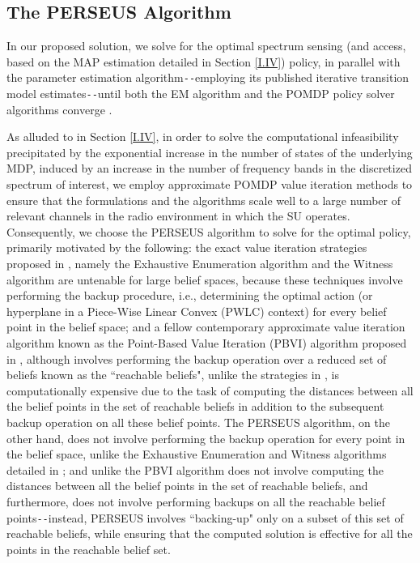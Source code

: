 \documentclass[12pt, draftcls, onecolumn]{IEEEtran}
\begin{document}
\subsection{The PERSEUS Algorithm}\label{II.II}
In our proposed solution, we solve for the optimal spectrum sensing (and access, based on the MAP estimation detailed in Section \ref{I.IV}) policy, in parallel with the parameter estimation algorithm\texttt{-{}-}employing its published iterative transition model estimates\texttt{-{}-}until both the EM algorithm and the POMDP policy solver algorithms converge \cite{WCL:paper}.

As alluded to in Section \ref{I.IV}, in order to solve the computational infeasibility precipitated by the exponential increase in the number of states of the underlying MDP, induced by an increase in the number of frequency bands in the discretized spectrum of interest, we employ approximate POMDP value iteration methods to ensure that the formulations and the algorithms scale well to a large number of relevant channels in the radio environment in which the SU operates. Consequently, we choose the PERSEUS algorithm \cite{WCL:13} to solve for the optimal policy, primarily motivated by the following: the exact value iteration strategies proposed in \cite{PUOccupancy:18}, namely the Exhaustive Enumeration algorithm and the Witness algorithm are untenable for large belief spaces, because these techniques involve performing the backup procedure, i.e., determining the optimal action (or hyperplane in a Piece-Wise Linear Convex (PWLC) context) for every belief point in the belief space; and a fellow contemporary approximate value iteration algorithm known as the Point-Based Value Iteration (PBVI) algorithm proposed in \cite{PUOccupancy:17}, although involves performing the backup operation over a reduced set of beliefs known as the ``reachable beliefs", unlike the strategies in \cite{PUOccupancy:17}, is computationally expensive due to the task of computing the distances between all the belief points in the set of reachable beliefs in addition to the subsequent backup operation on all these belief points. The PERSEUS algorithm, on the other hand, does not involve performing the backup operation for every point in the belief space, unlike the Exhaustive Enumeration and Witness algorithms detailed in \cite{PUOccupancy:18}; and unlike the PBVI algorithm \cite{PUOccupancy:17} does not involve computing the distances between all the belief points in the set of reachable beliefs, and furthermore, does not involve performing backups on all the reachable belief points\texttt{-{}-}instead, PERSEUS involves ``backing-up" only on a subset of this set of reachable beliefs, while ensuring that the computed solution is effective for all the points in the reachable belief set.
\end{document}

